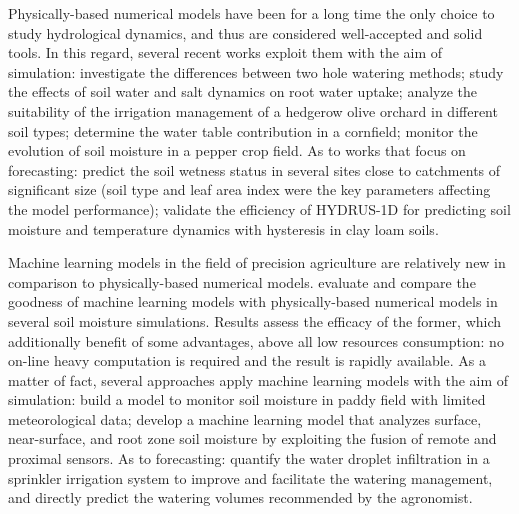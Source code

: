 Physically-based numerical models have been for a long time the only choice to study hydrological dynamics, and thus are considered well-accepted and solid tools.
In this regard, several recent works exploit them with the aim of simulation: \cite{Pan2021} investigate the differences between two hole watering methods;  \cite{Li20152382} study the effects of soil water and salt dynamics on root water uptake; \cite{Egea2016197} analyze the suitability of the irrigation management of a hedgerow olive orchard in different soil types; \cite{Cordeiro2016139} determine the water table contribution in a cornfield; \cite{Zapata-Sierra2021} monitor the evolution of soil moisture in a pepper crop field.
As to works that focus on forecasting: \cite{chen2014spatial} predict the soil wetness status in several sites close to catchments of significant size (soil type and leaf area index were the key parameters affecting the model performance); \cite{shein2019validation} validate the efficiency of HYDRUS-1D for predicting soil moisture and temperature dynamics with hysteresis in clay loam soils.

Machine learning models in the field of precision agriculture are relatively new in comparison to physically-based numerical models. 
\cite{Karandish2016892} evaluate and compare the goodness of machine learning models with physically-based numerical models in several soil moisture simulations.
Results assess the efficacy of the former, which additionally benefit of some advantages, above all low resources consumption: no on-line heavy computation is required and the result is rapidly available.
As a matter of fact, several approaches apply machine learning models with the aim of simulation: \cite{arif2013estimation} build a model to monitor soil moisture in paddy field with limited meteorological data; \cite{Babaeian2021} develop a machine learning model that analyzes surface, near-surface, and root zone soil moisture by exploiting the fusion of remote and proximal sensors.
As to forecasting: \cite{Liang2021} quantify the water droplet infiltration in a sprinkler irrigation system to improve and facilitate the watering management, \cite{Jimenez20201327} and \cite{Goldstein2018421} directly predict the watering volumes recommended by the agronomist.

